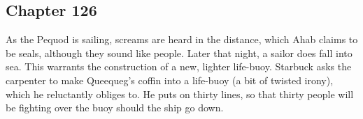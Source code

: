 \subsection{Chapter 126}

As the Pequod is sailing, screams are heard in the distance, which Ahab claims
to be seals, although they sound like people. Later that night, a sailor does
fall into sea. This warrants the construction of a new, lighter life-buoy.
Starbuck asks the carpenter to make Queequeg's coffin into a life-buoy (a bit
of twisted irony), which he reluctantly obliges to. He puts on thirty lines, so
that thirty people will be fighting over the buoy should the ship go down.
